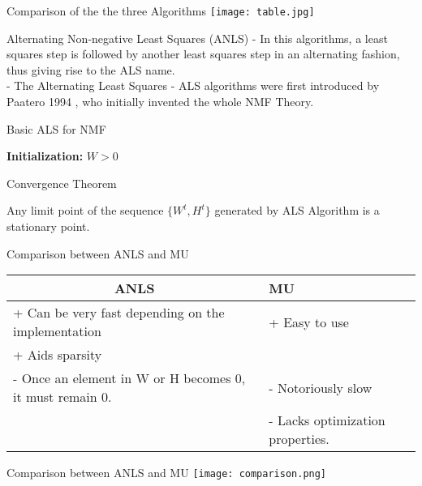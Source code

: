 \documentclass[aspectratio=169]{beamer}
\begin{document}
\begin{frame}{Comparison of the the three Algorithms}
    \texttt{[image: table.jpg]}\\
\end{frame}
\begin{frame}{Alternating Non-negative Least Squares (ANLS)}
    - In this algorithms, a least squares step is followed by another least squares step in an alternating fashion, thus giving rise to the ALS name.\\
    - The Alternating Least Squares - ALS algorithms were first introduced by Paatero 1994 , 
    who initially invented the whole NMF Theory.
    \begin{algorithm}[H]
        \caption{Basic ALS for NMF}
        \textbf{Initialization:} $W > 0$\;
    \end{algorithm}
\end{frame}
\begin{frame}{Convergence Theorem}
    \begin{theorem}
        Any limit point of the sequence $\{W^{t} , H^{t}\}$ generated by ALS Algorithm  is a stationary point.
    \end{theorem}
    \end{frame}
    \begin{frame}{Comparison between ANLS and MU}
\begin{tabular}{|l|l|}
    \hline
    \multicolumn{1}{|c|}{ANLS} & MU \\
    \hline
    + Can be very fast depending on the implementation & + Easy to use  \\
    + Aids sparsity &  \\
    \hline
    -  Once an element in W or H becomes 0, it must remain 0. & - Notoriously slow \\
      & - Lacks optimization properties.\\
    \hline
\end{tabular}   
\end{frame}
\begin{frame}{Comparison between ANLS and MU}
    \texttt{[image: comparison.png]}\\
\end{frame}
\end{document}
